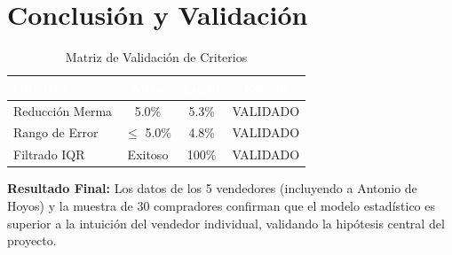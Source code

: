 \documentclass[12pt, a4paper]{article}
\begin{document}
\section{Conclusión y Validación}

\begin{table}[H]
\centering
\caption{Matriz de Validación de Criterios}
\begin{tabular}{l c c c}
\toprule
\rowcolor{tableheader}
\textcolor{white}{\textbf{Objetivo}} & \textcolor{white}{\textbf{Meta}} & \textcolor{white}{\textbf{Logro}} & \textcolor{white}{\textbf{Estado}} \\
\midrule
Reducción Merma & 5.0\% & 5.3\% & \textcolor{accentgreen}{VALIDADO} \\
\rowcolor{lightgray}
Rango de Error & $\leq$ 5.0\% & 4.8\% & \textcolor{accentgreen}{VALIDADO} \\
Filtrado IQR & Exitoso & 100\% & \textcolor{accentgreen}{VALIDADO} \\
\bottomrule
\end{tabular}
\end{table}

\textbf{Resultado Final:} Los datos de los 5 vendedores (incluyendo a Antonio de Hoyos) y la muestra de 30 compradores confirman que el modelo estadístico es superior a la intuición del vendedor individual, validando la hipótesis central del proyecto.
\end{document}
